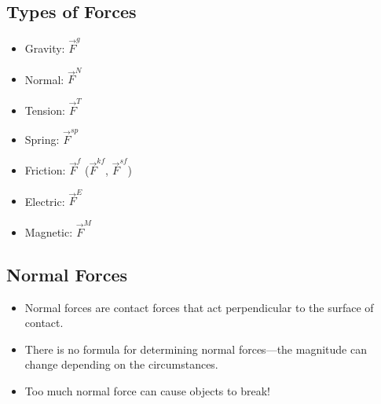 \documentclass[]{article}
\begin{document}
\begin{PresentSpace}
\vspace{-10pt}
\section*{Types of Forces}
\vspace{-10pt}
\begin{itemize}
	\item Gravity: $\vec{F}^{g}$
	\item Normal: $\vec{F}^{N}$
	\item Tension: $\vec{F}^{T}$
	\item Spring: $\vec{F}^{sp}$
	\item Friction: $\vec{F}^{f}$ ($\vec{F}^{kf}$, $\vec{F}^{sf}$)
	\item Electric: $\vec{F}^{E}$
	\item Magnetic: $\vec{F}^{M}$
\end{itemize}
\end{PresentSpace}
\newpage
\begin{TeacherMargin}

\end{TeacherMargin}
\begin{PresentSpace}
\vspace{-10pt}
\section*{Normal Forces}
\vspace{-10pt}
\begin{itemize}
	\item Normal forces are contact forces that act perpendicular to the surface of contact.
	\item There is no formula for determining normal forces---the magnitude can change
	depending on the circumstances.
	\item Too much normal force can cause objects to break!
\end{itemize}
\end{PresentSpace}
\newpage
\begin{TeacherMargin}

\end{TeacherMargin}
\end{document}
